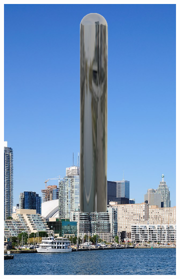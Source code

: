 \documentclass[%
reprint,
twocolumn,
nofootinbib,
 amsmath,amssymb,
 aps,
]{revtex4-2}
\begin{document}
\begin{figure}[H]
\begin{subfigure}{0.23\textwidth}
        \includegraphics[width=0.98\linewidth]{img/cn-bean-waterfront.jpg}
    \end{subfigure}
    \\
    \begin{subfigure}{0.23\textwidth}

\end{subfigure}
\end{figure}
\end{document}
